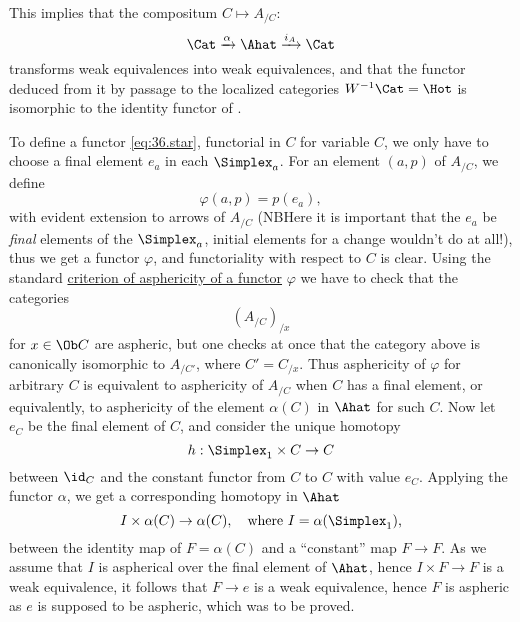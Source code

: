 This implies that the compositum $C \mapsto A_{/C}$:
\[\Cat \xrightarrow{\alpha} \Ahat \xrightarrow{i_A} \Cat\]
transforms weak equivalences into weak equivalences, and that the
functor deduced from it by passage to the localized categories
$W^{-1}\Cat = \Hot$ is isomorphic to the identity functor of
\Hot.

To define a functor \eqref{eq:36.star}, functorial in $C$ for variable
$C$, we only have to choose a final element $e_a$ in each
$\Simplex_a$. For an element $(a,p)$ of $A_{/C}$, we define
\[\varphi(a,p) = p(e_a),\]
with evident extension to arrows of $A_{/C}$ (NB\enspace Here it is important
that the $e_a$ be \emph{final} elements of the $\Simplex_a$, initial
elements for a change wouldn't do at all!), thus we get a functor
$\varphi$, and functoriality with respect to $C$ is clear. Using the
standard \hyperref[lem:asphericitycriterion]{criterion of asphericity
  of a functor} $\varphi$ we have to check that the categories
\[ (A_{/C})_{/x}\]
for $x\in\Ob C$ are aspheric, but one checks at once that the category
above is canonically isomorphic to $A_{/C'}$, where $C'=C_{/x}$. Thus
asphericity of $\varphi$ for arbitrary $C$ is equivalent to
asphericity of $A_{/C}$ when $C$ has a final element, or equivalently,
to asphericity of the element $\alpha(C)$ in $\Ahat$ for such
$C$. Now let $e_C$ be the final element of $C$, and consider the
unique homotopy
\[ h : \Simplex_1 \times C \to C\]
between $\id_C$ and the constant functor from $C$ to $C$ with value
$e_C$. Applying the functor $\alpha$, we get a corresponding homotopy
in $\Ahat$
\[ I \times \alpha(C) \to \alpha(C), \quad\text{where
  $I=\alpha(\Simplex_1)$,}\]
between the identity map of $F=\alpha(C)$ and a ``constant'' map $F\to
F$. As we assume that $I$ is aspherical over the final element of
$\Ahat$, hence $I\times F\to F$ is a weak equivalence, it follows
that $F\to e$ is a weak equivalence, hence $F$ is aspheric as $e$ is
supposed to be aspheric, which was to be proved.

